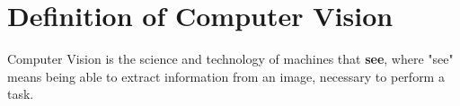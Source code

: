\section{Definition of Computer Vision}
Computer Vision is the science and technology of machines that \textbf{see}, where
"see" means being able to extract information from an image, necessary to perform a task.
